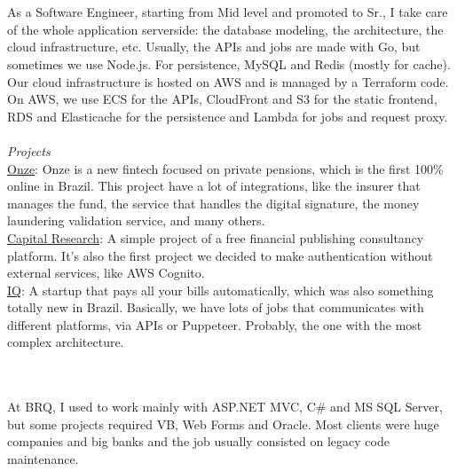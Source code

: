 \documentclass[12pt]{resume}
\begin{document}
    \begin{textblock}
        \\
        \\
        As a Software Engineer, starting from Mid level and promoted to Sr., I
        take care of the whole application serverside: the database modeling,
        the architecture, the cloud infrastructure, etc. Usually, the APIs and
        jobs are made with Go, but sometimes we use Node.js. For persistence,
        MySQL and Redis (mostly for cache). Our cloud infrastructure is hosted
        on AWS and is managed by a Terraform code. On AWS, we use ECS for the
        APIs, CloudFront and S3 for the static frontend, RDS and Elasticache for
        the persistence and Lambda for jobs and request proxy.
        \\\\
        \textit{Projects}
        \\
        \href{https://www.onze.com.br}{Onze}:
        Onze is a new fintech focused on private pensions, which is the first
        100\% online in Brazil. This project have a lot of integrations, like
        the insurer that manages the fund, the service that handles the digital
        signature, the money laundering validation service, and many others.
        \\
        \href{https://www.capitalresearch.com.br}{Capital Research}:
        A simple project of a free financial publishing consultancy platform.
        It's also the first project we decided to make authentication without
        external services, like AWS Cognito.
        \\
        \href{https://www.iq.com.br}{IQ}:
        A startup that pays all your bills automatically, which was also
        something totally new in Brazil. Basically, we have lots of jobs that
        communicates with different platforms, via APIs or Puppeteer. Probably,
        the one with the most complex architecture.
    \end{textblock}
    
    \begin{textblock}
        \\
        \\
        At BRQ, I used to work mainly with ASP.NET MVC, C\# and MS SQL Server,
        but some projects required VB, Web Forms and Oracle. Most clients were
        huge companies and big banks and the job usually consisted on legacy
        code maintenance.
    \end{textblock}
    
\end{document}
